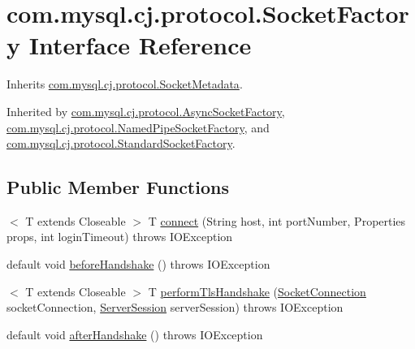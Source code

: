 \hypertarget{interfacecom_1_1mysql_1_1cj_1_1protocol_1_1_socket_factory}{}\section{com.\+mysql.\+cj.\+protocol.\+Socket\+Factory Interface Reference}
\label{interfacecom_1_1mysql_1_1cj_1_1protocol_1_1_socket_factory}


Inherits \mbox{\hyperlink{interfacecom_1_1mysql_1_1cj_1_1protocol_1_1_socket_metadata}{com.\+mysql.\+cj.\+protocol.\+Socket\+Metadata}}.



Inherited by \mbox{\hyperlink{classcom_1_1mysql_1_1cj_1_1protocol_1_1_async_socket_factory}{com.\+mysql.\+cj.\+protocol.\+Async\+Socket\+Factory}}, \mbox{\hyperlink{classcom_1_1mysql_1_1cj_1_1protocol_1_1_named_pipe_socket_factory}{com.\+mysql.\+cj.\+protocol.\+Named\+Pipe\+Socket\+Factory}}, and \mbox{\hyperlink{classcom_1_1mysql_1_1cj_1_1protocol_1_1_standard_socket_factory}{com.\+mysql.\+cj.\+protocol.\+Standard\+Socket\+Factory}}.

\subsection*{Public Member Functions}
\begin{DoxyCompactItemize}
\item 
$<$ T extends Closeable $>$ T \mbox{\hyperlink{interfacecom_1_1mysql_1_1cj_1_1protocol_1_1_socket_factory_a5c3f8f7b05e5ca6bdab1701cd5c24f83}{connect}} (String host, int port\+Number, Properties props, int login\+Timeout)  throws I\+O\+Exception
\item 
default void \mbox{\hyperlink{interfacecom_1_1mysql_1_1cj_1_1protocol_1_1_socket_factory_afc456b268ae05cf284598c3acc33829f}{before\+Handshake}} ()  throws I\+O\+Exception 
\item 
$<$ T extends Closeable $>$ T \mbox{\hyperlink{interfacecom_1_1mysql_1_1cj_1_1protocol_1_1_socket_factory_ab1a527a05b7f6bce77ecc9fb1933609b}{perform\+Tls\+Handshake}} (\mbox{\hyperlink{interfacecom_1_1mysql_1_1cj_1_1protocol_1_1_socket_connection}{Socket\+Connection}} socket\+Connection, \mbox{\hyperlink{interfacecom_1_1mysql_1_1cj_1_1protocol_1_1_server_session}{Server\+Session}} server\+Session)  throws I\+O\+Exception
\item 
default void \mbox{\hyperlink{interfacecom_1_1mysql_1_1cj_1_1protocol_1_1_socket_factory_acfbef33f9924346f5fbfc476bf0667d9}{after\+Handshake}} ()  throws I\+O\+Exception 
\end{DoxyCompactItemize}
